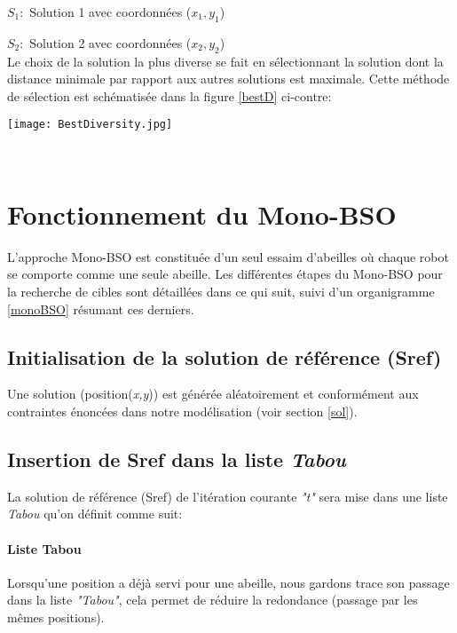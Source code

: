 $S_1 :$ Solution 1 avec coordonnées ($x_1 , y_1$)

$S_2 :$ Solution 2 avec coordonnées ($x_2 , y_2$)\\

Le choix de la solution la plus diverse se fait en sélectionnant la solution dont la distance minimale par rapport aux autres solutions est maximale.
Cette méthode de sélection est schématisée dans la figure \ref{bestD} ci-contre:

\noindent
\begin{center}	  
	\texttt{[image: BestDiversity.jpg]}%
	\vspace{-0.1 cm}
	\label{bestD}%
\end{center}




\textbf{ }\\


\section{Fonctionnement du Mono-BSO}
L’approche Mono-BSO est constituée d’un seul essaim d’abeilles où chaque robot se comporte comme une seule abeille. Les différentes étapes du Mono-BSO pour la recherche de cibles sont détaillées dans ce qui suit, suivi d'un organigramme \ref{monoBSO} résumant ces derniers.



\subsection{Initialisation de la solution de référence (Sref)}
Une solution (position(\textit{x,y})) est générée aléatoirement et conformément aux contraintes énoncées dans notre modélisation (voir section \ref{sol}).

\subsection{Insertion de Sref dans la liste \textit{Tabou}}
\label{etape2}
La solution de référence (Sref) de l'itération courante \textit{"t"} sera mise dans une liste \textit{Tabou} qu'on définit comme suit:
\paragraph{Liste Tabou }
Lorsqu'une position a déjà servi pour une abeille, nous gardons trace son passage dans la liste \textit{"Tabou"}, cela permet  de réduire la redondance (passage par les mêmes positions).  

